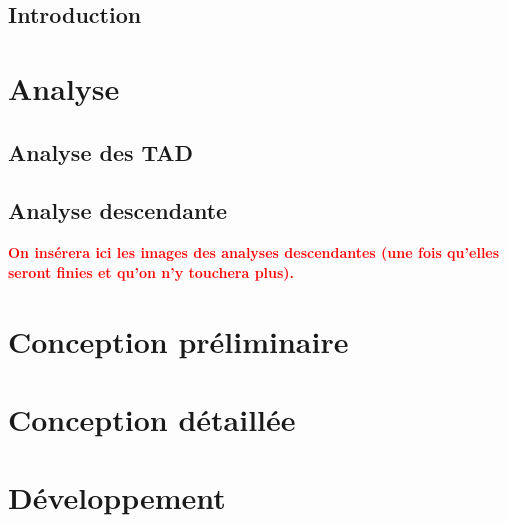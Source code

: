 \documentclass[11pt]{report}
\begin{document}
\thispagestyle{plain}
\chapter*{Introduction}
	
\tableofcontents

\part{Analyse}
\chapter{Analyse des TAD}


\chapter{Analyse descendante}
 {\huge \textbf{ \textcolor{red}{On insérera ici les images des analyses descendantes (une fois qu'elles seront finies et qu'on n'y touchera plus).}} }

\setcounter{chapter}{0}
\part{Conception préliminaire}


\setcounter{chapter}{0}
\part{Conception détaillée}


\setcounter{chapter}{0}
\part{Développement}
\end{document}
